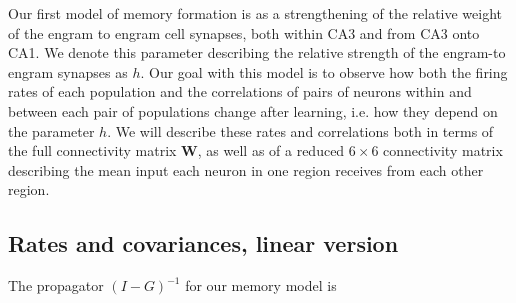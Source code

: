 \documentclass [12pt]{amsart}
\theoremstyle{definition}
\newcommand{\inv}{^{-1}}
\begin{document}
Our first model of memory formation is as a strengthening of the relative weight of the engram to engram cell synapses, both within CA3 and from CA3 onto CA1. We denote this parameter describing the relative strength of the engram-to engram synapses as $h$.
Our goal with this model is to observe how both the firing rates of each population and the correlations of pairs of neurons within and between each pair of populations change after learning, i.e. how they depend on the parameter $h$. 
We will describe these rates and correlations both in terms of the full connectivity matrix $\mathbf W$, as well as of a reduced $6\times 6$ connectivity matrix describing the mean input each neuron in one region receives from each other region. 


\subsection{Rates and covariances, linear version}
The propagator $(I-G)\inv$ for our memory model is 
\end{document}
